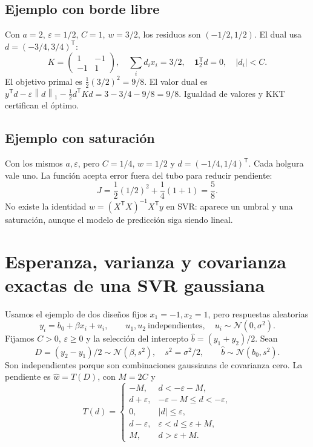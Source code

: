 \documentclass[11pt,a4paper]{article}
\newcommand{\T}{^{\mathsf T}}
\newcommand{\norm}[1]{\left\lVert #1\right\rVert}
\newcommand{\ones}{\mathbf 1}
\theoremstyle{definition}
\begin{document}
\subsection{Ejemplo con borde libre}
Con $a=2$, $\varepsilon=1/2$, $C=1$, $w=3/2$, los residuos son $(-1/2,1/2)$. El dual usa $d=(-3/4,3/4)\T$:
\[
K=\begin{pmatrix}1&-1\\-1&1\end{pmatrix},\quad
\sum_id_ix_i=3/2,\quad\ones_2\T d=0,\quad|d_i|<C.
\]
El objetivo primal es $\tfrac12(3/2)^2=9/8$. El valor dual es $y\T d-\varepsilon\norm d_1-\tfrac12d\T Kd=3-3/4-9/8=9/8$. Igualdad de valores y KKT certifican el óptimo.
\subsection{Ejemplo con saturación}
Con los mismos $a,\varepsilon$, pero $C=1/4$, $w=1/2$ y $d=(-1/4,1/4)\T$. Cada holgura vale uno. La función acepta error fuera del tubo para reducir pendiente:
\[
J=\frac12(1/2)^2+\frac14(1+1)=\frac58.
\]
No existe la identidad $w=(X\T X)^{-1}X\T y$ en SVR: aparece un umbral y una saturación, aunque el modelo de predicción siga siendo lineal.

\section{Esperanza, varianza y covarianza exactas de una SVR gaussiana}
Usamos el ejemplo de dos diseños fijos $x_1=-1,x_2=1$, pero respuestas aleatorias
\[
y_i=b_0+\beta x_i+u_i,\qquad u_1,u_2\ \text{independientes},\quad u_i\sim\mathcal N(0,\sigma^2).
\]
Fijamos $C>0$, $\varepsilon\ge0$ y la selección del intercepto $\widehat b=(y_1+y_2)/2$. Sean
\[
D=(y_2-y_1)/2\sim\mathcal N(\beta,s^2),\quad s^2=\sigma^2/2,
\qquad\widehat b\sim\mathcal N(b_0,s^2).
\]
Son independientes porque son combinaciones gaussianas de covarianza cero. La pendiente es $\widehat w=T(D)$, con $M=2C$ y
\[
T(d)=\begin{cases}
-M,&d<-\varepsilon-M,\\
d+\varepsilon,&-\varepsilon-M\le d<-\varepsilon,\\
0,&|d|\le\varepsilon,\\
d-\varepsilon,&\varepsilon<d\le\varepsilon+M,\\
M,&d>\varepsilon+M.
\end{cases}
\]
\end{document}
